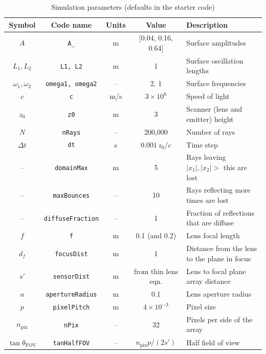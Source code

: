 \documentclass[../../me144_244_student.tex]{subfiles}
\begin{document}
\begin{table}[H]
  \begin{center}
  \caption{Simulation parameters (defaults in the starter code)}
  \begin{tabular}{||c|c|c|c|l||}
    \hline
    Symbol & Code name & Units & Value & Description \\
    \hline \hline
    $A$ & \texttt{A\_} & m & [0.04, 0.16, 0.64] & Surface amplitudes \\
    $L_1, L_2$ & \texttt{L1, L2} & m & 1 & Surface oscillation lengths \\
    $\omega_1, \omega_2$ & \texttt{omega1, omega2} & -- & 2, 1 & Surface frequencies \\
    $c$ & \texttt{c} & m/s & $3 \times 10^8$ & Speed of light \\
    $z_0$ & \texttt{z0} & m & 3 & Scanner (lens and emitter) height \\
    $N$ & \texttt{nRays} & -- & 200,000 & Number of rays \\
    $\Delta t$ & \texttt{dt} & s & $0.001\, z_0 / c$ & Time step \\
    -- & \texttt{domainMax} & m & 5 & Rays leaving $|x_1|, |x_2| >$ this are lost \\
    -- & \texttt{maxBounces} & -- & 10 & Rays reflecting more times are lost \\
    -- & \texttt{diffuseFraction} & -- & 1 & Fraction of reflections that are diffuse \\
    $f$ & \texttt{f} & m & 0.1 (and 0.2) & Lens focal length \\
    $d_f$ & \texttt{focusDist} & m & 1 & Distance from the lens to the plane in focus \\
    $s'$ & \texttt{sensorDist} & m & from thin lens eqn. & Lens to focal plane array distance \\
    $a$ & \texttt{apertureRadius} & m & 0.1 & Lens aperture radius \\
    $p$ & \texttt{pixelPitch} & m & $4 \times 10^{-3}$ & Pixel size \\
    $n_{\text{pix}}$ & \texttt{nPix} & -- & 32 & Pixels per side of the array \\
    $\tan\theta_{\text{FOV}}$ & \texttt{tanHalfFOV} & -- & $n_{\text{pix}} p / (2 s')$ & Half field of view \\
    \hline
  \end{tabular}
  \end{center}
\end{table}
\end{document}
